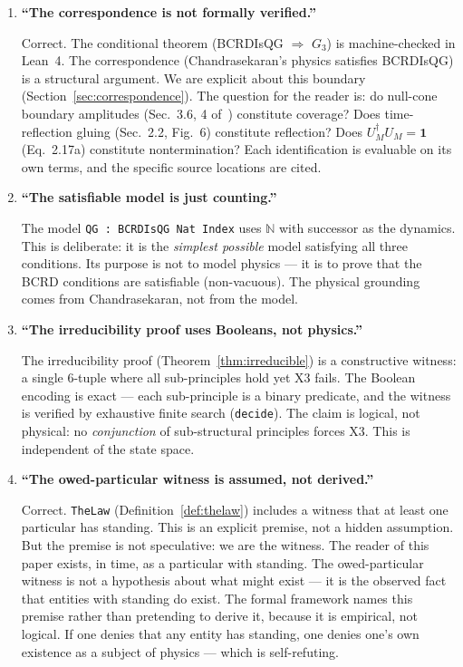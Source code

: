 \documentclass[11pt,a4paper]{article}
\theoremstyle{definition}
\theoremstyle{remark}
\begin{document}
\begin{enumerate}
\item \textbf{``The correspondence is not formally verified.''}

Correct. The conditional theorem (BCRDIsQG $\Rightarrow$ $G_3$) is machine-checked in Lean~4. The correspondence (Chandrasekaran's physics satisfies BCRDIsQG) is a structural argument. We are explicit about this boundary (Section~\ref{sec:correspondence}). The question for the reader is: do null-cone boundary amplitudes (Sec.~3.6, 4 of~\cite{chandrasekaran2026}) constitute coverage? Does time-reflection gluing (Sec.~2.2, Fig.~6) constitute reflection? Does $U_M^\dagger U_M = \mathbf{1}$ (Eq.~2.17a) constitute nontermination? Each identification is evaluable on its own terms, and the specific source locations are cited.

\item \textbf{``The satisfiable model is just counting.''}

The model \texttt{QG : BCRDIsQG Nat Index} uses $\mathbb{N}$ with successor as the dynamics. This is deliberate: it is the \emph{simplest possible} model satisfying all three conditions. Its purpose is not to model physics --- it is to prove that the BCRD conditions are satisfiable (non-vacuous). The physical grounding comes from Chandrasekaran, not from the model.

\item \textbf{``The irreducibility proof uses Booleans, not physics.''}

The irreducibility proof (Theorem~\ref{thm:irreducible}) is a constructive witness: a single 6-tuple where all sub-principles hold yet X3 fails. The Boolean encoding is exact --- each sub-principle is a binary predicate, and the witness is verified by exhaustive finite search (\texttt{decide}). The claim is logical, not physical: no \emph{conjunction} of sub-structural principles forces X3. This is independent of the state space.

\item \textbf{``The owed-particular witness is assumed, not derived.''}

Correct. \texttt{TheLaw} (Definition~\ref{def:thelaw}) includes a witness that at least one particular has standing. This is an explicit premise, not a hidden assumption. But the premise is not speculative: we are the witness. The reader of this paper exists, in time, as a particular with standing. The owed-particular witness is not a hypothesis about what might exist --- it is the observed fact that entities with standing do exist. The formal framework names this premise rather than pretending to derive it, because it is empirical, not logical. If one denies that any entity has standing, one denies one's own existence as a subject of physics --- which is self-refuting.


\end{enumerate}
\end{document}
